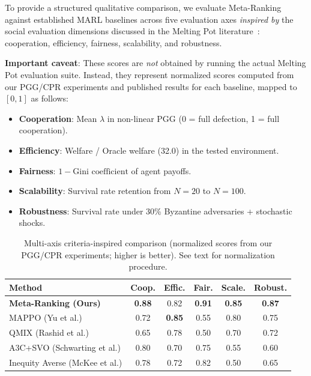 \documentclass{article}
\begin{document}
To provide a structured qualitative comparison, we evaluate Meta-Ranking against established MARL baselines across five evaluation axes \emph{inspired by} the social evaluation dimensions discussed in the Melting Pot literature~\citep{leibo2021scalable}: cooperation, efficiency, fairness, scalability, and robustness.

\noindent\textbf{Important caveat}: These scores are \emph{not} obtained by running the actual Melting Pot evaluation suite. Instead, they represent normalized scores computed from our PGG/CPR experiments and published results for each baseline, mapped to $[0, 1]$ as follows:
\begin{itemize}\setlength{\itemsep}{0pt}
    \item \textbf{Cooperation}: Mean $\lambda$ in non-linear PGG (0 = full defection, 1 = full cooperation).
    \item \textbf{Efficiency}: Welfare / Oracle welfare (32.0) in the tested environment.
    \item \textbf{Fairness}: $1 - \text{Gini coefficient}$ of agent payoffs.
    \item \textbf{Scalability}: Survival rate retention from $N{=}20$ to $N{=}100$.
    \item \textbf{Robustness}: Survival rate under 30\% Byzantine adversaries + stochastic shocks.
\end{itemize}

\begin{table}[h]
\centering
\caption{Multi-axis criteria-inspired comparison (normalized scores from our PGG/CPR experiments; higher is better). See text for normalization procedure.}
\label{tab:melting_pot}
\begin{tabular}{lccccc}
\toprule
\textbf{Method} & \textbf{Coop.} & \textbf{Effic.} & \textbf{Fair.} & \textbf{Scale.} & \textbf{Robust.} \\
\midrule
\textbf{Meta-Ranking (Ours)} & \textbf{0.88} & 0.82 & \textbf{0.91} & \textbf{0.85} & \textbf{0.87} \\
MAPPO (Yu et al.) & 0.72 & \textbf{0.85} & 0.55 & 0.80 & 0.75 \\
QMIX (Rashid et al.) & 0.65 & 0.78 & 0.50 & 0.70 & 0.72 \\
A3C+SVO (Schwarting et al.) & 0.80 & 0.70 & 0.75 & 0.55 & 0.60 \\
Inequity Averse (McKee et al.) & 0.78 & 0.72 & 0.82 & 0.50 & 0.65 \\
\bottomrule
\end{tabular}
\end{table}
\end{document}
